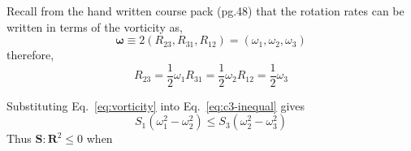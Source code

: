 Recall from the hand written course pack (pg.48) that the rotation rates
can be written in terms of the vorticity as,
\begin{equation}
    \mathbf{\omega} \equiv 2 (R_{23}, R_{31}, R_{12}) = (\omega_{1}, \omega_{2}, \omega_{3} )
\end{equation}
therefore,
\begin{subequations}
    \begin{equation}
        R_{23} = \frac{1}{2} \omega_{1}
    \end{equation}
    \begin{equation}
        R_{31} = \frac{1}{2} \omega_{2}
    \end{equation}
    \begin{equation}
        R_{12} = \frac{1}{2} \omega_{3}
    \end{equation}
    \label{eq:vorticity}
\end{subequations}

Substituting Eq.~\ref{eq:vorticity} into Eq.~\ref{eq:c3-inequal} gives
\begin{equation}
    S_{1} ( \omega_{1}^2 - \omega_{2}^2 ) \leq S_{3} (\omega_{2}^2 - \omega_{3}^2)
\end{equation}
Thus $\mathbf{S}:\mathbf{R}^2 \leq 0$ when
